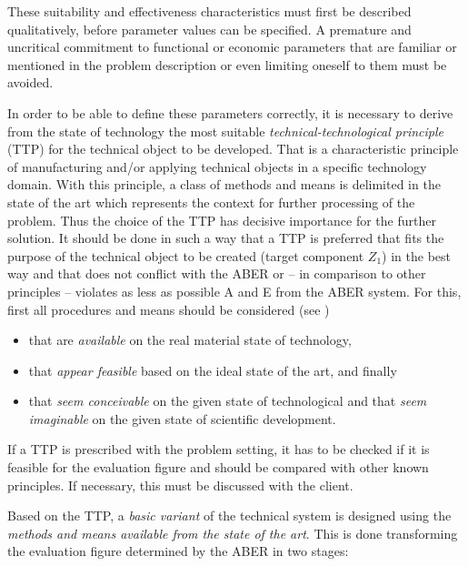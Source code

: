 \documentclass[11pt,a4paper]{article}
\begin{document}
These suitability and effectiveness characteristics must first be described
qualitatively, before parameter values can be specified. A premature and
uncritical commitment to functional or economic parameters that are familiar
or mentioned in the problem description or even limiting oneself to them must
be avoided.

In order to be able to define these parameters correctly, it is necessary to
derive from the state of technology the most suitable
\emph{technical-technological principle} (TTP) for the technical object to be
developed. That is a characteristic principle of manufacturing and/or applying
technical objects in a specific technology domain. With this principle, a
class of methods and means is delimited in the state of the art which
represents the context for further processing of the problem. Thus the choice
of the TTP has decisive importance for the further solution. It should be done
in such a way that a TTP is preferred that fits the purpose of the technical
object to be created (target component $Z_1$) in the best way and that does
not conflict with the ABER or -- in comparison to other principles -- violates
as less as possible A and E from the ABER system. For this, first all
procedures and means should be considered (see \cite[Appendix 1]{ProHEAL-21})
\begin{itemize}
\item that are \emph{available} on the real material state of technology,
\item that \emph{appear feasible} based on the ideal state of the art, and
  finally
\item that \emph{seem conceivable} on the given state of technological and
  that \emph{seem imaginable} on the given state of scientific development.
\end{itemize}
If a TTP is prescribed with the problem setting, it has to be checked if it is
feasible for the evaluation figure and should be compared with other known
principles. If necessary, this must be discussed with the client.

Based on the TTP, a \emph{basic variant} of the technical system is designed
using the \emph{methods and means available from the state of the art}.  This
is done transforming the evaluation figure determined by the ABER in two
stages:
\end{document}
